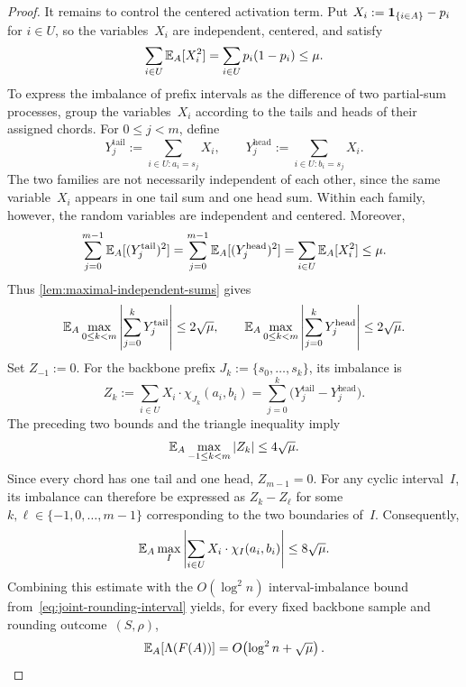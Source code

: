 \documentclass[12pt,a4paper,oneside]{report}
\begin{document}
\begin{proof}
It remains to control the centered activation term.  Put
$X_i:=\mathbf{1}_{\{i\in A\}}-p_i$ for $i\in U$, so the variables~$X_i$ are
independent, centered, and satisfy
\[
    \sum_{i\in U}\mathbb{E}_A[X_i^2]
    =\sum_{i\in U}p_i(1-p_i)
    \le\mu.
\]
To express the imbalance of prefix intervals as the difference of
two partial-sum processes, group the variables~$X_i$ according to the tails
and heads of their assigned chords.  For $0\le j<m$, define
\[
    Y_j^{\mathrm{tail}}
    :=\sum_{i\in U:a_i=s_j}X_i,
    \qquad
    Y_j^{\mathrm{head}}
    :=\sum_{i\in U:b_i=s_j}X_i.
\]
The two families are not necessarily independent of each other, since the
same variable~$X_i$ appears in one tail sum and one head sum.  Within each
family, however, the random variables are independent and centered.  Moreover,
\[
    \sum_{j=0}^{m-1}\mathbb{E}_A[(Y_j^{\mathrm{tail}})^2]
    =\sum_{j=0}^{m-1}\mathbb{E}_A[(Y_j^{\mathrm{head}})^2]
    =\sum_{i\in U}\mathbb{E}_A[X_i^2]
    \le\mu.
\]
Thus \cref{lem:maximal-independent-sums} gives
\[
    \mathbb{E}_A\max_{0\le k<m}
      \left|\sum_{j=0}^kY_j^{\mathrm{tail}}\right|
    \le2\sqrt\mu,
    \qquad
    \mathbb{E}_A\max_{0\le k<m}
      \left|\sum_{j=0}^kY_j^{\mathrm{head}}\right|
    \le2\sqrt\mu.
\]
Set $Z_{-1}:=0$.  For the backbone prefix
$J_k:=\{s_0,\ldots,s_k\}$, its imbalance is
\[
    Z_k:=\sum_{i\in U}X_i\cdot\chi_{J_k}(a_i,b_i)
    =\sum_{j=0}^k
      \bigl(Y_j^{\mathrm{tail}}-Y_j^{\mathrm{head}}\bigr).
\]
The preceding two bounds and the triangle inequality imply
\[
    \mathbb{E}_A\max_{-1\le k<m}|Z_k|\le4\sqrt\mu.
\]
Since every chord has one tail and one head, $Z_{m-1}=0$.  For any
cyclic interval~$I$, its imbalance can therefore be expressed as
$Z_k-Z_\ell$ for some $k,\ell\in\{-1,0,\ldots,m-1\}$ corresponding to the
two boundaries of~$I$.  Consequently,
\[
    \mathbb{E}_A\max_I
      \left|\sum_{i\in U}X_i\cdot\chi_I(a_i,b_i)\right|
    \le8\sqrt\mu.
\]
Combining this estimate with the $O(\log^2 n)$ interval-imbalance
bound from~\cref{eq:joint-rounding-interval} yields, for every fixed backbone
sample and rounding outcome~$(S,\rho)$,
\begin{equation}\label{eq:adaptive-active-imbalance}
    \mathbb{E}_A[\Lambda(F(A))]
    =O\!\left(\log^2 n+\sqrt\mu\right).
\end{equation}


\end{proof}
\end{document}
